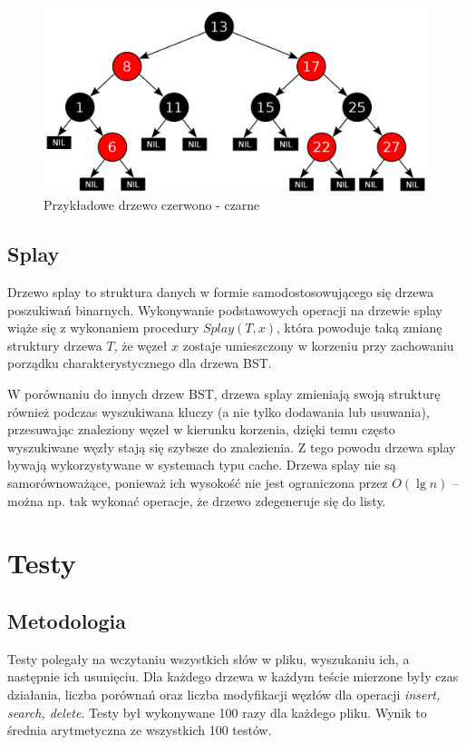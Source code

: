 \documentclass[10pt,a4paper]{article}
\theoremstyle{definition}
\theoremstyle{definition}
\theoremstyle{definition}
\begin{document}
        \begin{figure}[h]
        	\centering
        	\includegraphics[scale=0.25]{images/rbt}
        	\caption{Przykładowe drzewo czerwono - czarne}
        	\label{fig:rbt}
       	\end{figure}
        
    \subsection{Splay}
        Drzewo splay to struktura danych w formie samodostosowującego się drzewa poszukiwań binarnych. Wykonywanie podstawowych operacji na drzewie splay wiąże się z wykonaniem procedury $Splay(T, x)$, która powoduje taką zmianę struktury drzewa $T$, że węzeł $x$ zostaje umieszczony w korzeniu przy zachowaniu porządku charakterystycznego dla drzewa BST.
        
        W porównaniu do innych drzew BST, drzewa splay zmieniają swoją strukturę również podczas wyszukiwana kluczy (a nie tylko dodawania lub usuwania), przesuwając znaleziony węzeł w kierunku korzenia, dzięki temu często wyszukiwane węzły stają się szybsze do znalezienia. Z tego powodu drzewa splay bywają wykorzystywane w systemach typu cache. Drzewa splay nie są samorównoważące, ponieważ ich wysokość nie jest ograniczona przez $O(\lg n)$ – można np. tak wykonać operacje, że drzewo zdegeneruje się do listy. 
\section{Testy}
    \subsection{Metodologia}
        Testy polegały na wczytaniu wszystkich słów w pliku, wyszukaniu ich, a następnie ich usunięciu.
        Dla każdego drzewa w każdym teście mierzone były czas działania, liczba porównań oraz liczba modyfikacji węzłów dla operacji \textit{insert, search, delete}. Testy był wykonywane 100 razy dla każdego pliku. Wynik to średnia arytmetyczna ze wszystkich 100 testów.
        
\end{document}
